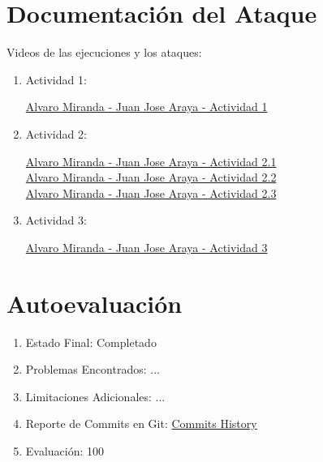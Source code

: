 \documentclass{article}
\begin{document}
\section*{Documentación del Ataque}

Videos de las ejecuciones y los ataques: \\

\begin{enumerate}
  \item Actividad 1:
  
  \href{https://www.loom.com/share/622ec72dc2cb4c658d06e8dee2589afd}{Alvaro Miranda - Juan Jose Araya - Actividad 1} \\
  
  \item Actividad 2:
  
  \href{https://www.loom.com/share/36b82066d6d043168116ed0fc0b293b6}{Alvaro Miranda - Juan Jose Araya - Actividad 2.1} \\
  
  \href{https://www.loom.com/share/6dc3ff3fbb97469085bb2e26dcbf3220}{Alvaro Miranda - Juan Jose Araya - Actividad 2.2} \\
  
  \href{https://www.loom.com/share/466ba0ef96464f9a95a7eb8b19e8fb2f}{Alvaro Miranda - Juan Jose Araya - Actividad 2.3} \\
  
  \item Actividad 3:
  
  \href{https://www.loom.com/share/ae3e916e6bf14555b860367652aa316d}{Alvaro Miranda - Juan Jose Araya - Actividad 3} \\
  
\end{enumerate}



\section*{Autoevaluación}

\begin{enumerate}
    \item Estado Final: Completado
    \item Problemas Encontrados: ...
    \item Limitaciones Adicionales: ...
    \item Reporte de Commits en Git: \href{https://github.com/varitomirandacr/SeguridadSO_RaceCondition/commits/main}{Commits History}
    \item Evaluación: 100%
\end{enumerate}
\end{document}

